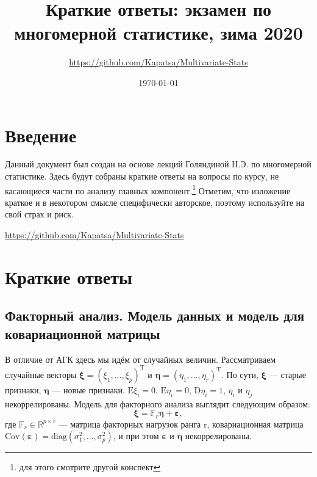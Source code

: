 \documentclass[12pt,a4paper,final]{article}
\author{\url{https://github.com/Kapatsa/Multivariate-Stats}}
\title{Краткие ответы: экзамен по многомерной статистике, зима 2020}
\date{\today}
\newcommand{\1}{\mathds{1}}
\begin{document}
\maketitle
\tableofcontents

\newpage
\section{Введение}

Данный документ был создан на основе лекций Голяндиной Н.Э. по многомерной статистике. Здесь будут собраны краткие ответы на вопросы по курсу, не касающиеся части по анализу главных компонент.\footnote{для этого смотрите другой конспект} Отметим, что изложение краткое и в некотором смысле специфически авторское, поэтому используйте на свой страх и риск.

\url{https://github.com/Kapatsa/Multivariate-Stats}

\section{Краткие ответы}


\subsection{Факторный анализ. Модель данных и модель для ковариационной матрицы}

В отличие от АГК здесь мы идём от случайных величин. Рассматриваем случайные векторы $\bm \xi = (\xi_1,\ldots,\xi_p)^\mathrm{T}$ и $\bm \eta = (\eta_1,\ldots,\eta_r)^\mathrm{T}$. По сути, $\bm \xi$ --- старые признаки, $\bm \eta$ --- новые признаки. $ \mathrm{E} \xi_i = 0,\, \mathrm{E} \eta_i = 0,\,  \mathrm{D} \eta_i = 1$,  $\eta_i$ и $\eta_j$ некоррелированы. Модель для факторного анализа выглядит следующим образом:
$$
\bm \xi = \mathbb{F}_r \bm \eta + \bm \varepsilon,
$$
где $\mathbb{F}_r \in \mathbb{R}^{p \times r}$ --- матрица факторных нагрузок ранга r, ковариационная матрица $\mathrm{Cov}(\bm \varepsilon) = \mathrm{diag} (\sigma^2_1,\ldots, \sigma_p^2)$, и при этом $\bm \varepsilon$ и $\bm \eta$ некоррелированы.
\end{document}
